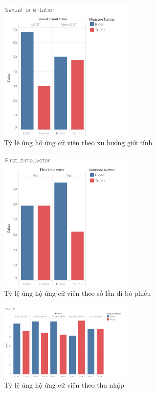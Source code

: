 \documentclass[14pt, a4paper]{article}
\numberwithin{equation}{section}
\numberwithin{figure}{section}
\numberwithin{dl}{section}
\numberwithin{md}{section}
\numberwithin{bd}{section}
\numberwithin{dn}{section}
\numberwithin{hq}{section}
\begin{document}
    \begin{figure}[h!]
        \centering
        \includegraphics[width=0.6\textwidth]{figures/Sexual_orientation.png}
        \caption{Tỷ lệ ủng hộ ứng cử viên theo xu hướng giới tính}
    \end{figure}

    \begin{figure}[h!]
        \centering
        \includegraphics[width=0.6\textwidth]{figures/First_time_voter.png}
        \caption{Tỷ lệ ủng hộ ứng cử viên theo số lần đi bỏ phiếu}
    \end{figure}

    \begin{figure}[h!]
        \centering
        \includegraphics[width=0.6\textwidth]{figures/income.png}
        \caption{Tỷ lệ ủng hộ ứng cử viên theo thu nhập}
    \end{figure}
\end{document}
